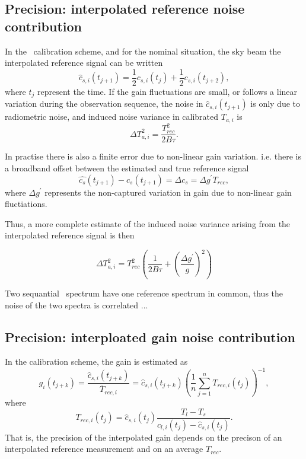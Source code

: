 \subsection*{Precision: interpolated reference noise contribution}
In the \smr\ calibration scheme, and for the nominal situation, the sky beam the interpolated
reference signal can be written
\begin{equation}
\hat{c}_{s,i}(t_{j+1}) = \frac{1}{2}c_{s,i}(t_{j}) + \frac{1}{2}c_{s,i}(t_{j+2}), 
\end{equation}
where \(t_{j}\) represent the time.  
If the gain fluctuations are small, or follows a linear variation during the
observation sequence, the noise in \(\hat{c}_{s,i}(t_{j+1})\) is only due to radiometric
noise, and induced noise variance in calibrated \(T_{a,i}\) is
\begin{equation}
\Delta T_{a,i}^2 = \frac{T_{rec}^{2}}{2B\tau}.
\end{equation}

In practise there is also a finite error due to non-linear gain variation.
i.e. there is a broadband offset between the estimated and true reference signal 
\begin{equation}
\hat{c_{s}}(t_{j+1}) - c_{s}(t_{j+1}) = \Delta c_{s} = \Delta g^{'} T_{rec},
\end{equation}
where \(\Delta g^{'}\) represents the non-captured variation in gain
due to non-linear gain fluctiations. 

Thus, a more complete estimate of the induced noise variance arising from the
interpolated reference signal is then

\begin{equation}
\Delta T_{a,i}^2 = T_{rec}^{2}\left(\frac{1}{2B\tau} + \left(\frac{\Delta g^{'}}{g}\right)^{2}\right)
\end{equation}
 
Two sequantial \smr\ spectrum have one reference spectrum in common, thus the noise
of the two spectra is correlated ...  
   
\subsection*{Precision: interploated gain noise contribution}

In the calibration scheme, the gain is estimated as
\begin{equation}
g_{i}(t_{j+k}) = \frac{\hat{c}_{s,i}(t_{j+k})}{\overline{T}_{rec,i}} = \hat{c}_{s,i}(t_{j+k})\left(\frac{1}{n}\sum_{j=1}^{n}T_{rec,i}(t_{j})\right)^{-1}, 
\end{equation}
where
\begin{equation}
T_{rec,i}(t_{j}) = \hat{c}_{s,i}(t_{j}) \frac{ T_{l} - T_{s} }{  c_{l,i}(t_{j})- \hat{c}_{s,i}(t_{j})  }.
\end{equation}
That is, the precision of the interpolated gain depends on the precison of an interpolated
reference measurement and on an average \(T_{rec}\). 

